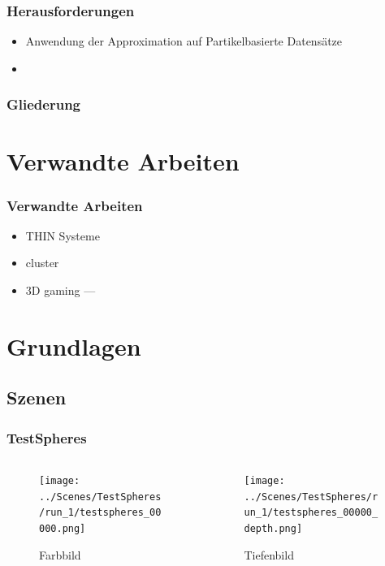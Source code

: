 \documentclass[xcolor=dvipsnames]{beamer}
\begin{document}
\begin{frame}
	\frametitle{Herausforderungen}
	
	\vspace*{0.4cm}
	
	\begin{itemize}
		\setlength{\itemsep}{8pt}
		
		\item Anwendung der Approximation auf Partikelbasierte Datensätze
		\item 
	\end{itemize}
	
\end{frame}

\begin{frame}
	\frametitle{Gliederung}
	\tableofcontents
\end{frame}

\section{Verwandte Arbeiten}
\begin{frame}
\frametitle{Verwandte Arbeiten}

	\begin{itemize}
		\item THIN Systeme
		\item cluster
		\item 3D gaming ---
	\end{itemize}
\end{frame}

\section{Grundlagen}

\subsection{Szenen}

\begin{frame}
\frametitle{TestSpheres}
	\begin{columns}
		\begin{column}{5cm}
			\begin{figure}
				\texttt{[image: ../Scenes/TestSpheres/run\_1/testspheres\_00000.png]}
				\caption{Farbbild}
			\end{figure}
		\end{column}
		\begin{column}{5cm}
			\begin{figure}
				\texttt{[image: ../Scenes/TestSpheres/run\_1/testspheres\_00000\_depth.png]}
				\caption{Tiefenbild}
			\end{figure}
		\end{column}
	\end{columns}
\end{frame}
\end{document}
